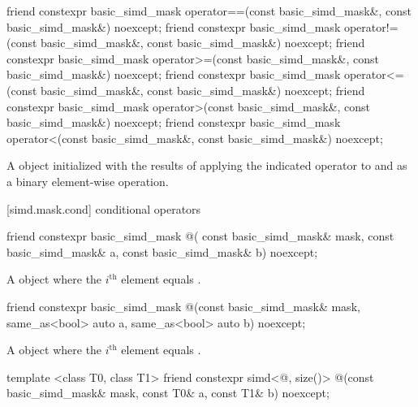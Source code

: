 \begin{itemdecl}
friend constexpr basic_simd_mask
  operator==(const basic_simd_mask&, const basic_simd_mask&) noexcept;
friend constexpr basic_simd_mask
  operator!=(const basic_simd_mask&, const basic_simd_mask&) noexcept;
friend constexpr basic_simd_mask
  operator>=(const basic_simd_mask&, const basic_simd_mask&) noexcept;
friend constexpr basic_simd_mask
  operator<=(const basic_simd_mask&, const basic_simd_mask&) noexcept;
friend constexpr basic_simd_mask
  operator>(const basic_simd_mask&, const basic_simd_mask&) noexcept;
friend constexpr basic_simd_mask
  operator<(const basic_simd_mask&, const basic_simd_mask&) noexcept;
\end{itemdecl}

\begin{itemdescr}
  \pnum\returns
  A  object initialized with the results of applying the indicated operator to  and  as a binary element-wise operation.
\end{itemdescr}

[simd.mask.cond]{ conditional operators}

\begin{itemdecl}
friend constexpr basic_simd_mask @\simdselect@(
  const basic_simd_mask& mask, const basic_simd_mask& a, const basic_simd_mask& b) noexcept;
\end{itemdecl}

\begin{itemdescr}
  \pnum\returns
  A  object where the $i^\text{th}$ element equals  \foralli.
\end{itemdescr}

\begin{itemdecl}
friend constexpr basic_simd_mask
@\simdselect@(const basic_simd_mask& mask, same_as<bool> auto a, same_as<bool> auto b) noexcept;
\end{itemdecl}

\begin{itemdescr}
  \pnum\returns
  A  object where the $i^\text{th}$ element equals  \foralli.
\end{itemdescr}

\begin{itemdecl}
template <class T0, class T1>
  friend constexpr simd<@\seebelow@, size()>
    @\simdselect@(const basic_simd_mask& mask, const T0& a, const T1& b) noexcept;
\end{itemdecl}

